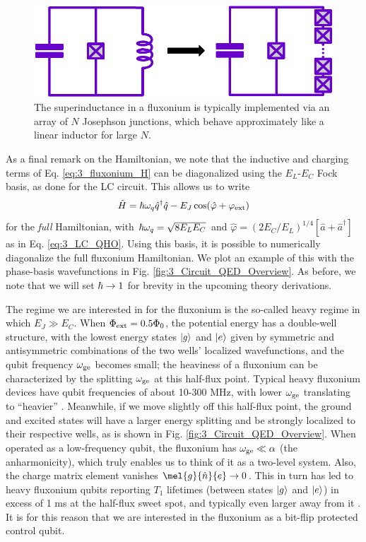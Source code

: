\begin{figure}
    \centering
    \includegraphics[width=0.7\linewidth]{Figures/3/Superinductance.pdf}
    \caption{The superinductance in a fluxonium is typically implemented via an array of $N$ Josephson junctions, which behave approximately like a linear inductor for large $N$.}
    \label{fig:3_Superinductance}
\end{figure}

As a final remark on the Hamiltonian, we note that the inductive and charging terms of Eq. \eqref{eq:3_fluxonium_H} can be diagonalized using the $E_L$-$E_C$ Fock basis, as done for the LC circuit. This allows us to write
\begin{equation}
    \hat{H} = \hbar\omega_q\hat{q}^\dagger\hat{q} - E_J\cos(\hat{\varphi} + \varphi_{\rm ext})
\end{equation}
for the \textit{full} Hamiltonian, with $\hbar\omega_q = \sqrt{8 E_LE_C}$ and $\hat{\varphi} = (2E_C/E_L)^{1/4}[\hat{a} + \hat{a}^\dagger]$ as in Eq. \eqref{eq:3_LC_QHO}. Using this basis, it is possible to numerically diagonalize the full fluxonium Hamiltonian. We plot an example of this with the phase-basis wavefunctions in Fig. \ref{fig:3_Circuit_QED_Overview}. As before, we note that we will set $\hbar \to 1$ for brevity in the upcoming theory derivations. 

The regime we are interested in for the fluxonium is the so-called heavy regime in which $E_J \gg E_C$. When $\Phi_{\rm ext} = 0.5\Phi_0$, the potential energy has a double-well structure, with the lowest energy states $\lvert g\rangle$ and $\lvert e\rangle$ given by symmetric and antisymmetric combinations of the two wells' localized wavefunctions, and the qubit frequency $\omega_{\rm ge}$ becomes small; the heaviness of a fluxonium can be characterized by the splitting $\omega_{\rm ge}$ at this half-flux point. Typical heavy fluxonium devices have qubit frequencies of about 10-300 MHz, with lower $\omega_{\rm ge}$ translating to ``heavier'' \cite{earnest2018realization, zhang2021universal, ding2023FTF}. Meanwhile, if we move slightly off this half-flux point, the ground and excited states will have a larger energy splitting and be strongly localized to their respective wells, as is shown in Fig. \ref{fig:3_Circuit_QED_Overview}. When operated as a low-frequency qubit, the fluxonium has $\omega_{\rm ge} \ll \alpha$ (the anharmonicity), which truly enables us to think of it as a two-level system. Also, the charge matrix element vanishes $\mel{g}{\hat{n}}{e} \to 0$. This in turn has led to heavy fluxonium qubits reporting $T_1$ lifetimes (between states $\lvert g\rangle$ and $\lvert e\rangle$) in excess of 1 ms at the half-flux sweet spot, and typically even larger away from it \cite{earnest2018realization, zhang2021universal, ding2023FTF, nguyen2019high, somoroff2023millisecond}. It is for this reason that we are interested in the fluxonium as a bit-flip protected control qubit. 

